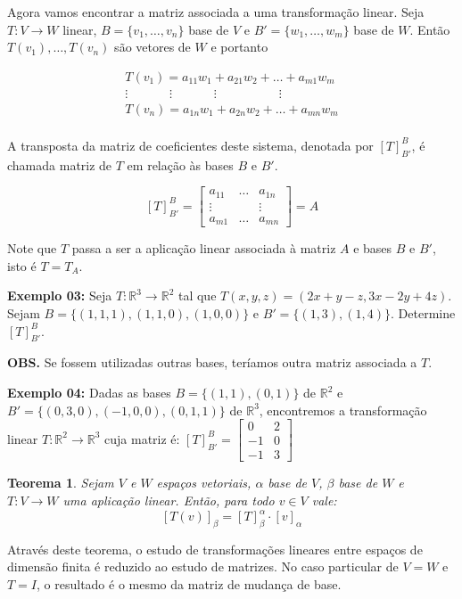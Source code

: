 \documentclass[oneside,a4paper,12pt]{article}
\newtheorem{theorem}{Teorema}[section]
\begin{document}
Agora vamos encontrar a matriz associada a uma transformação linear. Seja $T: V \rightarrow W$ linear, $B = \{ v_1, \dots, v_n \}$ base de $V$ e $B' = \{ w_1, \dots, w_m \}$ base de $W$. Então $T(v_1), \dots, T(v_n)$ são vetores de $W$ e portanto

\begin{eqnarray*}
T(v_1) = a_{11}w_1 + a_{21}w_2 + \dots + a_{m1}w_m \\
\vdots \hspace{40pt} \vdots \hspace{40pt} \vdots \hspace{60pt} \vdots \\
T(v_n) = a_{1n}w_1 + a_{2n}w_2 + \dots + a_{mn}w_m \\
\end{eqnarray*}


A transposta da matriz de coeficientes deste sistema, denotada por $[T]_{B'}^{B}$, é chamada matriz de $T$ em relação às bases $B$ e $B'$.

$$ [T]_{B'}^{B} = \left[
\begin{array}{ccc}
a_{11}	&	\dots	&	a_{1n} \\
\vdots	&			&	\vdots	\\
a_{m1}	&	\dots	&	a_{mn}
\end{array}
\right] = A$$

Note que $T$ passa a ser a aplicação linear associada à matriz $A$ e bases $B$ e $B'$, isto é $T = T_A$.

{\bf Exemplo 03:} Seja $T:\mathbb{R}^3 \rightarrow \mathbb{R}^2$ tal que $T(x,y,z) = (2x + y - z, 3x - 2y + 4z)$. Sejam $B = \{ (1,1,1), (1,1,0), (1,0,0) \}$ e $B' = \{ (1,3), (1,4) \}$. Determine $[T]_{B'}^{B}$.
\vspace{150pt}

{\bf OBS.} Se fossem utilizadas outras bases, teríamos outra matriz associada a $T$.

{\bf Exemplo 04: }Dadas as bases $B = \{ (1,1), (0,1) \}$ de $\mathbb{R}^2$ e $B' = \{ (0,3,0), (-1,0,0), (0,1,1) \}$ de $\mathbb{R}^3$, encontremos a transformação linear $T: \mathbb{R}^2 \rightarrow \mathbb{R}^3$ cuja matriz é:
$[T]_{B'}^{B} = \left[
\begin{array}{cc}
0	&	2	\\
-1	&	0	\\
-1	&	3
\end{array}
\right]  $

\vspace{150pt}

\begin{theorem}
	Sejam $V$ e $W$ espaços vetoriais, $\alpha$ base de $V$, $\beta$ base de $W$ e $T: V \rightarrow W$ uma aplicação linear. Então, para todo $v \in V$ vale:
	$$[T(v)]_{\beta} = [T]_{\beta}^{\alpha} \cdot [v]_{\alpha}$$
	\vspace{100pt}
\end{theorem}
Através deste teorema, o estudo de transformações lineares entre espaços de dimensão finita é reduzido ao estudo de matrizes. No caso particular de $V = W$ e $T = I$, o resultado é o mesmo da matriz de mudança de base.
\end{document}
